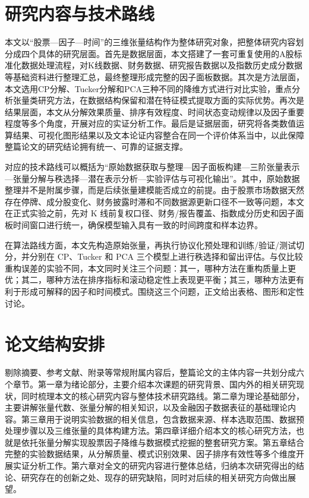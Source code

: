 \section{研究内容与技术路线}

本文以“股票—因子—时间”的三维张量结构作为整体研究对象，把整体研究内容划分成四个具体的研究层面。首先是数据层面，本文搭建了一套可重复使用的A股标准化数据处理流程，对K线数据、财务数据、研究报告数据以及指数历史成分数据等基础资料进行整理汇总，最终整理形成完整的因子面板数据。其次是方法层面，本文选用CP分解、Tucker分解和PCA三种不同的降维方式进行对比实验，重点分析张量类研究方法，在数据结构保留和潜在特征模式提取方面的实际优势。再次是结果层面，本文从分解效果质量、排序有效程度、时间状态变动规律以及因子重要程度等多个角度，开展对应的实证分析工作。最后是证据层面，研究将各类数值运算结果、可视化图形结果以及文本论证内容整合在同一个评价体系当中，以此保障整篇论文的研究结论拥有统一、可靠的证据支撑。

对应的技术路线可以概括为“原始数据获取与整理—因子面板构建—三阶张量表示—张量分解与秩选择—潜在表示分析—实验评估与可视化输出”。其中，原始数据整理并不是附属步骤，而是后续张量建模能否成立的前提。由于股票市场数据天然存在停牌、成分股变化、财务披露时滞和不同数据源更新口径不一致等问题，本文在正式实验之前，先对 K 线前复权口径、财务/报告覆盖、指数成分历史和因子面板时间窗口进行统一，确保模型输入具有一致的时间跨度和样本边界。

在算法路线方面，本文先构造原始张量，再执行协议化预处理和训练/验证/测试切分，并分别在 CP、Tucker 和 PCA 三个模型上进行秩选择和留出评估。与仅比较重构误差的实验不同，本文同时关注三个问题：其一，哪种方法在重构质量上更优；其二，哪种方法在排序指标和滚动稳定性上表现更平衡；其三，哪种方法更有利于形成可解释的因子和时间模式。围绕这三个问题，正文给出表格、图形和定性讨论。

\section{论文结构安排}

剔除摘要、参考文献、附录等常规附属内容后，整篇论文的主体内容一共划分成六个章节。第一章为绪论部分，主要介绍本次课题的研究背景、国内外的相关研究现状，同时梳理本文的核心研究内容与整体技术研究路线。第二章为理论基础部分，主要讲解张量代数、张量分解的相关知识，以及金融因子数据表征的基础理论内容。第三章用于说明实验数据的相关信息，包含数据来源、样本选取范围、数据预处理步骤以及三维张量的具体构建方法。第四章详细介绍本文的核心研究方法，也就是依托张量分解实现股票因子降维与数据模式挖掘的整套研究方案。第五章结合完整的实验数据结果，从分解质量、模式识别效果、因子排序有效性等多个维度开展实证分析工作。第六章对全文的研究内容进行整体总结，归纳本次研究得出的结论、研究存在的创新之处、现存的研究缺陷，同时对后续的相关研究方向做出展望。

